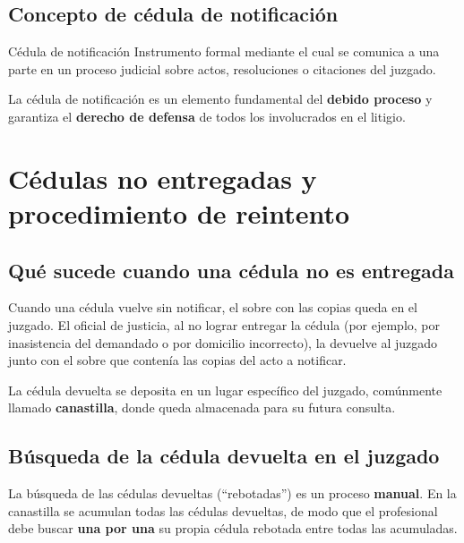 \documentclass[12pt,oneside]{book}
\begin{document}
\section{Concepto de cédula de notificación}

\begin{definition}{Cédula de notificación}
Instrumento formal mediante el cual se comunica a una parte en un proceso judicial sobre actos, resoluciones o citaciones del juzgado.
\end{definition}

La cédula de notificación es un elemento fundamental del \textbf{debido proceso} y garantiza el \textbf{derecho de defensa} de todos los involucrados en el litigio.

\chapter[Cédulas no entregadas y reintento]{Cédulas no entregadas y procedimiento de reintento}

\section{Qué sucede cuando una cédula no es entregada}

Cuando una cédula vuelve sin notificar, el sobre con las copias queda en el juzgado. El oficial de justicia, al no lograr entregar la cédula (por ejemplo, por inasistencia del demandado o por domicilio incorrecto), la devuelve al juzgado junto con el sobre que contenía las copias del acto a notificar.

La cédula devuelta se deposita en un lugar específico del juzgado, comúnmente llamado \textbf{canastilla}, donde queda almacenada para su futura consulta.


\section{Búsqueda de la cédula devuelta en el juzgado}

La búsqueda de las cédulas devueltas (``rebotadas'') es un proceso \textbf{manual}. En la canastilla se acumulan todas las cédulas devueltas, de modo que el profesional debe buscar \textbf{una por una} su propia cédula rebotada entre todas las acumuladas.
\end{document}
